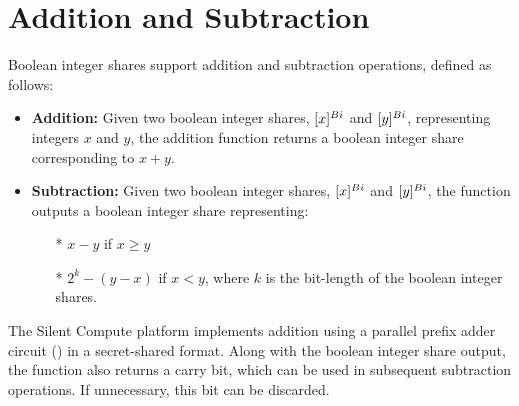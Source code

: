 \section{Addition and Subtraction}

Boolean integer shares support addition and subtraction operations, defined as follows:

\begin{itemize}
    \item {\bf Addition:} Given two boolean integer shares, $[x]^{Bi}$ and
          $[y]^{Bi}$, representing integers $x$ and $y$, the addition function returns a boolean integer share corresponding to $x+y$.
    \item {\bf Subtraction:} Given two boolean integer shares, $[x]^{Bi}$ and
          $[y]^{Bi}$, the function outputs a boolean integer share representing: 
          \begin{itemize}
          	\item[*] $x-y$ if $x \ge y$
          	\item[*] $2^k - (y - x)$ if $x < y$, where $k$ is the bit-length of the boolean integer shares.
          \end{itemize}
\end{itemize}

The Silent Compute platform implements addition using a parallel prefix adder circuit (\cite{Har03}) in a secret-shared format. Along with the boolean integer share output, the function also returns a carry bit, which can be used in subsequent subtraction operations. If unnecessary, this bit can be discarded.

